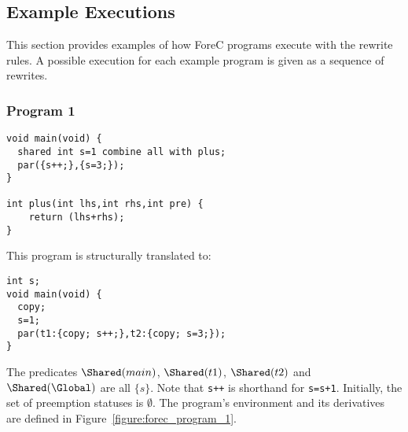 \subsection{Example Executions}
This section provides examples of how ForeC programs
execute with the rewrite rules. A possible execution 
for each example program is given as a sequence of 
rewrites. 

\subsubsection{Program 1}
\begin{lstlisting}[style=snippet]
void main(void) {
  shared int s=1 combine all with plus;
  par({s++;},{s=3;});
}

int plus(int lhs,int rhs,int pre) {
	return (lhs+rhs);
}
\end{lstlisting}
This program is structurally translated to:
\begin{lstlisting}[style=snippet]
int s;
void main(void) {
  copy;
  s=1;
  par(t1:{copy; s++;},t2:{copy; s=3;});
}
\end{lstlisting}
The predicates $\Shared(main)$, $\Shared(t1)$, $\Shared(t2)$ and 
$\Shared(\Global)$ are all $\lbrace s \rbrace$.
Note that \verb$s++$ is shorthand for \verb$s=s+1$.
Initially, the set of preemption statuses \Abort{}
is $\emptyset$. The program's environment \Environment{} and its
derivatives are defined in Figure~\ref{figure:forec_program_1}.
\newline

